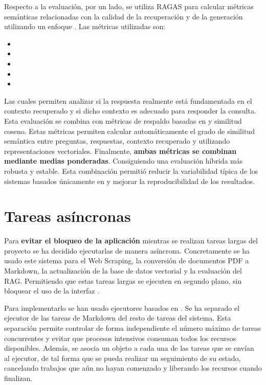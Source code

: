 Respecto a la evaluación, por un lado, se utiliza RAGAS para calcular métricas semánticas relacionadas con la calidad de la recuperación y de la generación utilizando un enfoque . Las métricas utilizadas son:
\begin{itemize}
 	\item {}
 	\item {}
 	\item {}
 	\item {} 
 	\item {}
\end{itemize}
Las cuales permiten analizar si la respuesta realmente está fundamentada en el contexto recuperado y si dicho contexto es adecuado para responder la consulta. Esta evaluación se combina con métricas de respaldo basadas en  y similitud coseno. Estas métricas permiten calcular automáticamente el grado de similitud semántica entre preguntas, respuestas, contexto recuperado y  utilizando representaciones vectoriales. Finalmente, \textbf{ambas métricas se combinan mediante medias ponderadas}. Consiguiendo una evaluación híbrida más robusta y estable. Esta combinación permitió reducir la variabilidad típica de los sistemas basados únicamente en  y mejorar la reproducibilidad de los resultados.

\section{Tareas asíncronas}
\label{rel:asinc}

Para \textbf{evitar el bloqueo de la aplicación} mientras se realizan tareas largas del proyecto se ha decidido ejecutarlas de manera asíncrona. Concretamente se ha usado este sistema para el Web Scraping, la conversión de documentos PDF a Markdown, la actualización de la base de datos vectorial y la evaluación del RAG. Permitiendo que estas tareas largas se ejecuten en segundo plano, sin bloquear el uso de la interfaz .

Para implementarlo se han usado ejecutores basados en . Se ha separado el ejecutor de las tareas de Markdown del resto de tareas del sistema. Esta separación permite controlar de forma independiente el número máximo de tareas concurrentes y evitar que procesos intensivos consuman todos los recursos disponibles. Además, se asocia un objeto  a cada una de las tareas que se envían al ejecutor, de tal forma que se pueda realizar un seguimiento de su estado, cancelando trabajos que aún no hayan comenzado y liberando los recursos cuando finalizan.

